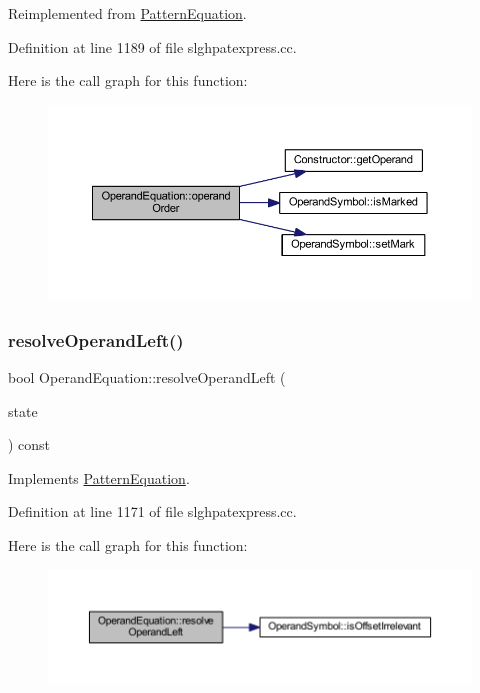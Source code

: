 Reimplemented from \mbox{\hyperlink{class_pattern_equation_a944d7114e5d5b6876352e555cc060829}{Pattern\+Equation}}.



Definition at line 1189 of file slghpatexpress.\+cc.

Here is the call graph for this function\+:
\nopagebreak
\begin{figure}[H]
\begin{center}
\leavevmode
\includegraphics[width=350pt]{class_operand_equation_ae6c672be7a442660c2923112b7dd3a4d_cgraph}
\end{center}
\end{figure}
\mbox{\label{class_operand_equation_a2a36915c92d63ee68c503a33daa79eda}} 
\subsubsection{\texorpdfstring{resolveOperandLeft()}{resolveOperandLeft()}}
{\footnotesize\ttfamily bool Operand\+Equation\+::resolve\+Operand\+Left (\begin{DoxyParamCaption}\item[{\mbox{\hyperlink{struct_operand_resolve}{Operand\+Resolve}} \&}]{state }\end{DoxyParamCaption}) const\hspace{0.3cm}{\ttfamily [virtual]}}



Implements \mbox{\hyperlink{class_pattern_equation_a16e885a945df91e3daf2dea6394ae6f2}{Pattern\+Equation}}.



Definition at line 1171 of file slghpatexpress.\+cc.

Here is the call graph for this function\+:
\nopagebreak
\begin{figure}[H]
\begin{center}
\leavevmode
\includegraphics[width=350pt]{class_operand_equation_a2a36915c92d63ee68c503a33daa79eda_cgraph}
\end{center}
\end{figure}


